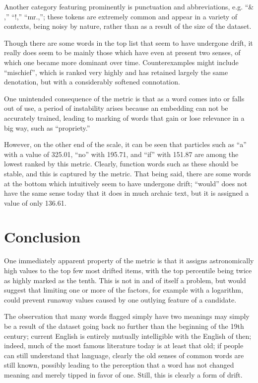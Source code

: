 \documentclass{article}
\begin{document}
Another category featuring prominently is punctuation and abbreviations, e.g. ``\& ,'' ``!,'' ``mr.,''; these tokens are extremely common and appear in a variety of contexts, being noisy by nature, rather than as a result of the size of the dataset.

Though there are some words in the top list that seem to have undergone drift, it really does seem to be mainly those which have even at present two senses, of which one became more dominant over time. Counterexamples might include ``mischief'', which is ranked very highly and has retained largely the same denotation, but with a considerably softened connotation.

One unintended consequence of the metric is that as a word comes into or falls out of use, a period of instability arises because an embedding can not be accurately trained, leading to marking of words that gain or lose relevance in a big way, such as ``propriety.''

However, on the other end of the scale, it can be seen that particles such as ``a'' with a value of 325.01, ``no'' with 195.71, and ``if'' with 151.87 are among the lowest ranked by this metric. Clearly, function words such as these should be stable, and this is captured by the metric. That being said, there are some words at the bottom which intuitively seem to have undergone drift; ``would'' does not have the same sense today that it does in much archaic text, but it is assigned a value of only 136.61.

\section{Conclusion}

One immediately apparent property of the metric is that it assigns astronomically high values to the top few most drifted items, with the top percentile being twice as highly marked as the tenth. This is not in and of itself a problem, but would suggest that limiting one or more of the factors, for example with a logarithm, could prevent runaway values caused by one outlying feature of a candidate.

The observation that many words flagged simply have two meanings may simply be a result of the dataset going back no further than the beginning of the 19th century; current English is entirely mutually intelligible with the English of then; indeed, much of the most famous literature today is at least that old; if people can still understand that language, clearly the old senses of common words are still known, possibly leading to the perception that a word has not changed meaning and merely tipped in favor of one. Still, this is clearly a form of drift.
\end{document}
